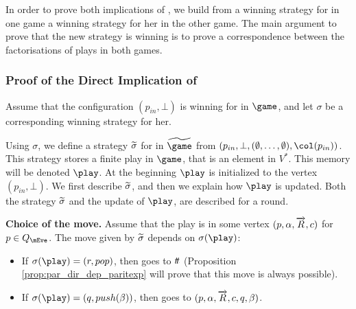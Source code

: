 In order to prove both implications of  , we
build from a winning strategy for \Eve in one game a winning strategy
for her in the other game. The main argument to prove that the new
strategy is winning is to prove a correspondence between the
factorisations of plays in both games.


\subsubsection{Proof of the Direct Implication of }



Assume that the configuration $(p_{in},\bot)$ is winning for \Eve in $\game$,
and let $\sigma$ be a corresponding winning strategy for her.


Using $\sigma$, we define a strategy $\widetilde{\sigma}$ for \Eve in
$\fgame$ from $(p_{in},\bot,(\emptyset,\dots,\emptyset),\pdscol{p_{in}})$.
This strategy stores a finite play in $\game$, that is an element in
$V^*$. This memory will
be denoted $\play$. At the beginning $\play$ is initialized to
the vertex $(p_{in},\bot)$. We first describe $\widetilde{\sigma}$, and then we
explain how $\play$ is updated. Both the strategy $\widetilde{\sigma}$ and the
update of $\play$, are described for a round.

\vspace{0.1cm}
\textbf{Choice of the move. } Assume that the play is in some
vertex $(p,\alpha,\overrightarrow{R},c)$ for $p\in Q_\mEve$. The
move given by $\widetilde{\sigma}$ depends on $\sigma(\play)$:
\begin{itemize}
\item If $\sigma(\play)=(r,pop)$, then \Eve goes to
$t\! t$ (Proposition \cref{prop:par_dir_dep_paritexp} will
  prove that this move is always possible).


\item If $\sigma(\play)=(q,push(\beta))$, then \Eve goes to
$(p,\alpha,\overrightarrow{R},c,q,\beta)$.
\end{itemize}

